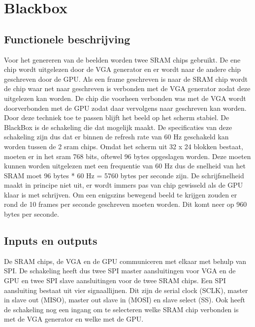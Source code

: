 \documentclass[oneside,dutch]{tudelft-report}
\begin{document}
\newpage


\chapter{Blackbox}
\section{Functionele beschrijving}
Voor het genereren van de beelden worden twee SRAM chips gebruikt. De ene chip wordt uitgelezen door de VGA generator en er wordt naar de andere chip geschreven door de GPU. Als een frame geschreven is naar de SRAM chip wordt de chip waar net naar geschreven is verbonden met de VGA generator zodat deze uitgelezen kan worden. De chip die voorheen verbonden was met de VGA wordt doorverbonden met de GPU zodat daar vervolgens naar geschreven kan worden. Door deze techniek toe te passen blijft het beeld op het scherm stabiel. De BlackBox is de schakeling die dat mogelijk maakt. De specificaties van deze schakeling zijn dus dat er binnen de refresh rate van 60 Hz geschakeld kan worden tussen de 2 sram chips. Omdat het scherm uit 32 x 24 blokken bestaat, moeten er in het sram 768 bits, oftewel 96 bytes opgeslagen worden. Deze moeten kunnen worden uitgelezen met een frequentie van 60 Hz dus de snelheid van het SRAM moet 96 bytes * 60 Hz = 5760 bytes per seconde zijn. De schrijfsnelheid maakt in principe niet uit, er wordt immers pas van chip gewisseld als de GPU klaar is met schrijven. Om een enigszins bewegend beeld te krijgen zouden er rond de 10 frames per seconde geschreven moeten worden. Dit komt neer op 960 bytes per seconde.
\section{Inputs en outputs}
De SRAM chips, de VGA en de GPU communiceren met elkaar met behulp van SPI. De schakeling heeft dus twee SPI master aansluitingen voor VGA en de GPU en twee SPI slave aansluitingen voor de twee SRAM chips. Een SPI aansluiting bestaat uit vier signaallijnen. Dit zijn de serial clock (SCLK), master in slave out (MISO), master out slave in (MOSI) en slave select (SS). Ook heeft de schakeling nog een ingang om te selecteren welke SRAM chip verbonden is met de VGA generator en welke met de GPU.
\end{document}
